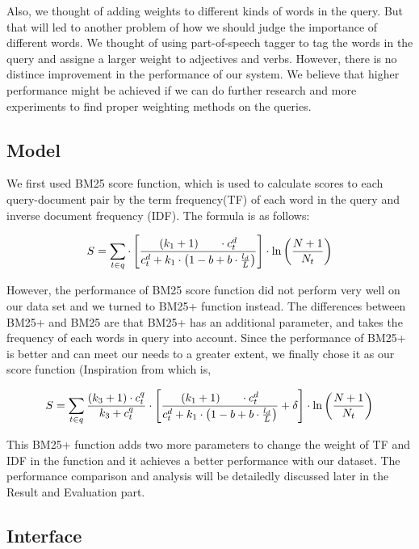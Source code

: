 \documentclass[sigconf,nonacm]{acmart}
\begin{document}
Also, we thought of adding weights to different kinds of words in the query. But that will led to another problem of how we should judge the importance of different words. We thought of using part-of-speech tagger to tag the words in the query and assigne a larger weight to adjectives and verbs. However, there is no distince improvement in the performance of our system. We believe that higher performance might be achieved if we can do further research and more experiments to find proper weighting methods on the queries.

\subsection{Model}

We first used BM25 score function, which is used to calculate scores to each query-document pair by the term frequency(TF) of each word in the query and inverse document frequency (IDF). The formula is as follows:

{
$$
  S = \sum_{t \in q} \cdot\left[\frac{\left(k_{1}+1\right) \\ \cdot c_{t}^{d}}{c_{t}^{d}+k_{1} \cdot\left(1-b+b \cdot \frac{l_{d}}{L}\right)}\right] \cdot \ln \left(\frac{N+1}{N_{t}}\right)
$$
}

However, the performance of BM25 score function did not perform very well on our data set and we turned to BM25+ function instead. The differences between BM25+ and BM25 are that BM25+ has an additional parameter, and takes the frequency of each words in query into account. Since the performance of BM25+ is better and can meet our needs to a greater extent, we finally chose it as our score function  (Inspiration from \cite{yang2016reproducibility} which is,

{
\Small
$$
  S = \sum_{t \in q} \frac{\left(k_{3}+1\right) \cdot c_{t}^{q}}{k_{3}+c_{t}^{q}} \cdot\left[\frac{\left(k_{1}+1\right) \\ \cdot c_{t}^{d}}{c_{t}^{d}+k_{1} \cdot\left(1-b+b \cdot \frac{l_{d}}{L}\right)}+\delta\right] \cdot \ln \left(\frac{N+1}{N_{t}}\right)
$$
}


This BM25+ function adds two more parameters to change the weight of TF and IDF in the function and it achieves a better performance with our dataset. The performance comparison and analysis will be detailedly discussed later in the Result and Evaluation part.

\subsection{Interface}
\end{document}
